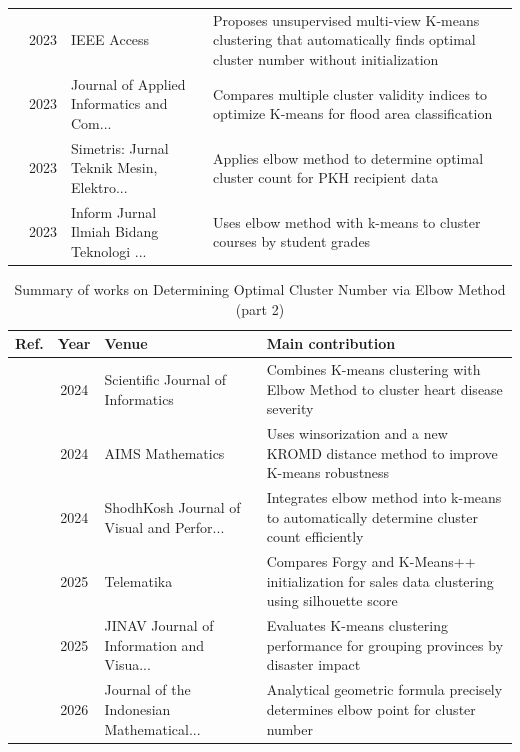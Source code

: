 \begin{table}[!t]
\begin{tabularx}{\textwidth}{@{}l c p{3.6cm} X@{}}
\cite{yang2023unsupervised} & 2023 & IEEE Access & Proposes unsupervised multi-view K-means clustering that automatically finds optimal cluster number without initialization \\
\cite{ashari2023analysis} & 2023 & Journal of Applied Informatics and Com... & Compares multiple cluster validity indices to optimize K-means for flood area classification \\
\cite{maori2023metode} & 2023 & Simetris: Jurnal Teknik Mesin, Elektro... & Applies elbow method to determine optimal cluster count for PKH recipient data \\
\cite{ghifari2023clustering} & 2023 & Inform Jurnal Ilmiah Bidang Teknologi ... & Uses elbow method with k-means to cluster courses by student grades \\
\bottomrule
\end{tabularx}
\end{table}

\begin{table}[!t]
\centering
\renewcommand{\arraystretch}{1.2}
\caption{Summary of works on Determining Optimal Cluster Number via Elbow Method (part 2)}
\begin{tabularx}{\textwidth}{@{}l c p{3.6cm} X@{}}
\toprule
\textbf{Ref.} & \textbf{Year} & \textbf{Venue} & \textbf{Main contribution} \\
\midrule
\cite{wala2024heart} & 2024 & Scientific Journal of Informatics & Combines K-means clustering with Elbow Method to cluster heart disease severity \\
\cite{khan2024addressing} & 2024 & AIMS Mathematics & Uses winsorization and a new KROMD distance method to improve K-means robustness \\
\cite{gowsic2024enhanced} & 2024 & ShodhKosh Journal of Visual and Perfor... & Integrates elbow method into k-means to automatically determine cluster count efficiently \\
\cite{abdillah2025implementation} & 2025 & Telematika & Compares Forgy and K-Means++ initialization for sales data clustering using silhouette score \\
\cite{meliyana2025performance} & 2025 & JINAV Journal of Information and Visua... & Evaluates K-means clustering performance for grouping provinces by disaster impact \\
\cite{herdiana2026more} & 2026 & Journal of the Indonesian Mathematical... & Analytical geometric formula precisely determines elbow point for cluster number \\
\bottomrule
\end{tabularx}
\end{table}

